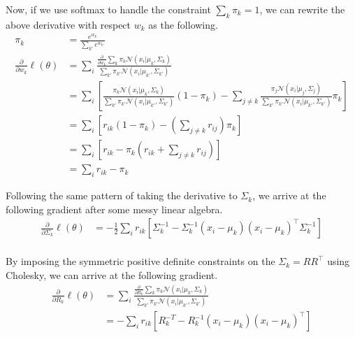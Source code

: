 \documentclass[11pt, letterpaper]{article}
\begin{document}
Now, if we use softmax to handle the constraint $\sum_k \pi_k = 1$, we can rewrite the above derivative with respect $w_k$ as the following.
\begin{align*}
    \pi_k &= \frac{e^{w_k}}{\sum_{k'} e^{w_{k'}}} \\
    \frac{\partial}{\partial w_k} \ell(\theta) &= 
        \sum_i \frac{\frac{\partial}{\partial w_k} \sum_{k} \pi_{k} \mathcal{N}(x_i|\mu_{k}, \Sigma_{k})}
                    {\sum_{k'} \pi_{k'} \mathcal{N}(x_i|\mu_{k'}, \Sigma_{k'})} \\
        &= \sum_i [
            \frac{\pi_k \mathcal{N}(x_i|\mu_{k}, \Sigma_{k})}{\sum_{k'} \pi_{k'} \mathcal{N}(x_i|\mu_{k'}, \Sigma_{k'})} (1-\pi_k)
            - \sum_{j \neq k} \frac{\pi_j \mathcal{N}(x_i|\mu_{j}, \Sigma_{j})}{\sum_{k'} \pi_{k'} \mathcal{N}(x_i|\mu_{k'}, \Sigma_{k'})} \pi_k
        ] \\
        &= \sum_i [r_{ik}(1-\pi_k) - (\sum_{j\neq k} r_{ij}) \pi_k] \\
        &= \sum_i [r_{ik} - \pi_k(r_{ik} + \sum_{j \neq k} r_{ij})] \\
        &= \sum_i r_{ik} - \pi_k
\end{align*}

Following the same pattern of taking the derivative to $\Sigma_k$, we arrive at the following gradient after some messy linear algebra.
\begin{align*}
    \frac{\partial}{\partial \Sigma_{k}} \ell(\theta) &=
        -\frac{1}{2} \sum_i r_{ik} [\Sigma_k^{-1} - \Sigma_k^{-1}(x_i-\mu_k)(x_i-\mu_k)^{\intercal}\Sigma_k^{-1}] \\
\end{align*}

By imposing the symmetric positive definite constraints on the $\Sigma_k = RR^{\intercal}$ using Cholesky, we can arrive at the following gradient.
\begin{align*}
    \frac{\partial}{\partial R_{k}} \ell(\theta) &=
        \sum_i \frac{\frac{\partial}{\partial R_{k}} \sum_{k} \pi_{k} \mathcal{N}(x_i|\mu_{k}, \Sigma_{k})}
                    {\sum_{k'} \pi_{k'} \mathcal{N}(x_i|\mu_{k'}, \Sigma_{k'})} \\
        &= -\sum_i r_{ik} [R_k^{-T} - R_k^{-1}(x_i-\mu_k)(x_i-\mu_k)^{\intercal}]
\end{align*}
\end{document}

